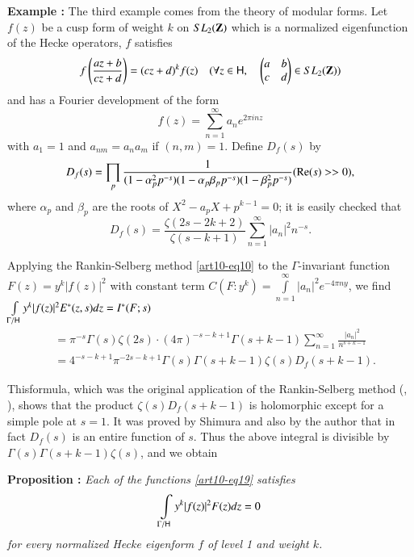 \medskip
\noindent
{\bfseries Example :\label{art10-exam3}}
The third example comes from the theory of modular forms. Let $f(z)$ be a cusp form of weight $k$ on $SL_2 (\mathbf{Z})$ which is a normalized eigenfunction of the Hecke operators, \ie $f$ satisfies 
$$
f\left(\frac{az+b}{cz+d} \right) = (cz + d)^k f(z) \quad (\forall z \in \mathsf{H}, \quad \left(\begin{matrix} a & b \\c & d 
\end{matrix}\right) \in SL_2 (\mathbf{Z}))
$$
and has a Fourier development of the form 
$$
f(z) = \sum\limits^\infty_{n=1} a_n e^{2 \pi in  z}
$$
with $a_1 = 1$ and $a_{nm} = a_n a_m$ if $(n,m) =1$. Define $D_f (s)$ by 
$$
D_{f} (s) = \prod\limits_p \frac{1}{(1-\alpha^2_p p^{-s}) (1-\alpha_p \beta_p p^{-s})(1-\beta^2_p p^{-s})}  (\operatorname{Re} (s) >> 0),
$$
where $\alpha_p$ and $\beta_p$ are the roots of $X^2 - a_p X + p^{k-1} = 0$; it is easily checked that 
$$
D_f (s) =\frac{\zeta (2s - 2k + 2)}{\zeta (s-k +1)} \sum\limits^\infty_{n=1} |a_n|^2 n^{-s}.
$$

Applying the Rankin-Selberg method \eqref{art10-eq10} to the $\Gamma$-invariant function $F(z) = y^k |f(z)|^2$ with constant term $C(F: y^k) = \int\limits^\infty_{n=1} |a_n|^2 e^{-4 \pi n y}$, we find $\int\limits_{\Gamma/ \mathsf{H}} y^k |f(z)|^2 E^\ast (z, s) d z = I^\ast (F;s)$
\begin{align*}
& = \pi^{-s} \Gamma (s) \zeta (2s) \cdot (4 \pi)^{-s-k+1} \Gamma (s+k -1) \sum\limits^\infty_{n=1} \frac{|a_n|^2}{n^{s+k-1}}\\
& = 4^{-s-k+1} \pi^{-2s -k +1} \Gamma (s) \Gamma (s+k-1) \zeta (s) D_f (s+k-1).
\end{align*}

This\pageoriginale formula, which was the original application of the Rankin-Selberg method (\cite{art10-5}, \cite{art10-6}), shows that the product $\zeta(s) D_f (s+k-1)$ is holomorphic except for a simple pole at $s =1$. It was proved by Shimura \cite{art10-7} and also by the author \cite{art10-11} that in fact $D_f (s)$ is an entire function of $s$. Thus the above integral is divisible by $\Gamma (s) \Gamma (s+ k -1) \zeta(s)$, and we obtain

\medskip
\noindent
{\bfseries Proposition :\label{art10-prop3}}
\textit{Each of the functions \eqref{art10-eq19} satisfies}
\begin{equation*}
\int\limits_{\Gamma/ \mathsf{H}} y^k |f(z)|^2 F (z) dz = 0 \label{art10-eq24}
\end{equation*}
\textit{for every normalized Hecke eigenform $f$ of level 1 and weight $k$.}

